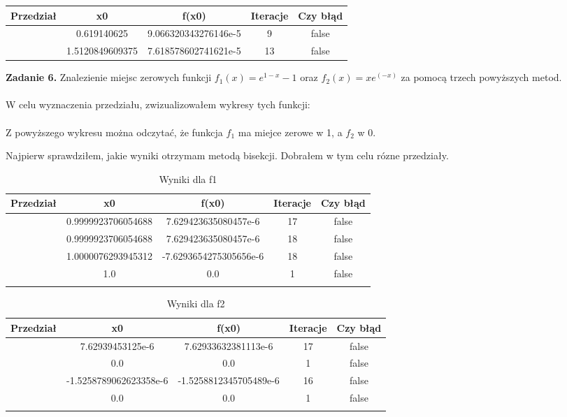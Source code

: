 \documentclass[15pt, a4paper]{article}
\begin{document}
\begin{longtable}{|c|c|c|c|c|}
    \hline
    \textbf{Przedział} & \textbf{x0} & \textbf{f(x0)} & \textbf{Iteracje} & \textbf{Czy błąd} \\
    \hline
    [0.0, 1.0] & 0.619140625 & 9.066320343276146e-5 & 9 & false \\
    \hline
    [1.0, 2.0] & 1.5120849609375 & 7.618578602741621e-5 & 13 & false \\
    \hline
\end{longtable}

\vspace{0.5cm}

\noindent\hrulefill

\vspace{0.5cm}


\noindent\textbf{Zadanie 6.} Znalezienie miejsc zerowych funkcji \( f_1(x) = e^{1-x} - 1 \) oraz \(f_2(x) = xe^(-x)\) za pomocą trzech powyższych metod.\\\\
\noindent W celu wyznaczenia przedziału, zwizualizowałem wykresy tych funkcji: \\\\

\noindent Z powyższego wykresu można odczytać, że funkcja \(f_1 \) ma miejce zerowe w 1, a \(f_2\) w 0. 

\noindent Najpierw sprawdziłem, jakie wyniki otrzymam metodą bisekcji. Dobrałem w tym celu rózne przedziały.


\begin{longtable}{|c|c|c|c|c|}
    \hline
    \textbf{Przedział} & \textbf{x0} & \textbf{f(x0)} & \textbf{Iteracje} & \textbf{Czy błąd} \\
    \hline
    [0.0, 1.0] & 0.9999923706054688 & 7.629423635080457e-6 & 17 & false \\
    \hline
    [-1.0, 1.0] & 0.9999923706054688 & 7.629423635080457e-6 & 18 & false \\
    \hline
    [-3.0, 3.0] & 1.0000076293945312 & -7.6293654275305656e-6 & 18 & false \\
    \hline
    [-0.0, 2.0] & 1.0 & 0.0 & 1 & false \\
    \hline
    \caption{Wyniki dla f1}
\end{longtable}


\begin{longtable}{|c|c|c|c|c|}
    \hline
    \textbf{Przedział} & \textbf{x0} & \textbf{f(x0)} & \textbf{Iteracje} & \textbf{Czy błąd} \\
    \hline
    [0.0, 1.0] & 7.62939453125e-6 & 7.62933632381113e-6 & 17 & false \\
    \hline
    [-1.0, 1.0] & 0.0 & 0.0 & 1 & false \\
    \hline
    [-0.4, 0.5] & -1.5258789062623358e-6 & -1.5258812345705489e-6 & 16 & false \\
    \hline
    [-0.5, 0.5] & 0.0 & 0.0 & 1 & false \\
    \hline
    \caption{Wyniki dla f2}
\end{longtable}
\end{document}

